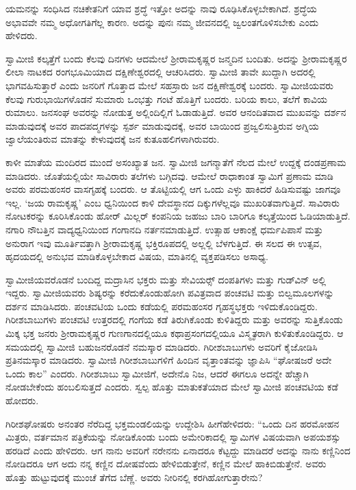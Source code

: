  ಯಮನನ್ನು ಸಂಧಿಸಿದ ನಚಿಕೇತನಿಗೆ ಯಾವ ಶ್ರದ್ಧೆ ಇತ್ತೋ ಅದನ್ನು ನಾವು ರೂಢಿಸಿಕೊಳ್ಳಬೇಕಾಗಿದೆ. ಶ್ರದ್ಧೆಯ ಅಭಾವವೇ ನಮ್ಮ ಅಧೋಗತಿಗೆಲ್ಲ ಕಾರಣ. ಅದನ್ನು ಪುನಃ ನಮ್ಮ ಜೀವನದಲ್ಲಿ ಜ್ವಲಂತಗೊಳಿಸಬೇಕು ಎಂದು ಹೇಳಿದರು. 

 ಸ್ವಾಮೀಜಿ ಕಲ್ಕತ್ತೆಗೆ ಬಂದು ಕೆಲವು ದಿನಗಳು ಆದಮೇಲೆ ಶ‍್ರೀರಾಮಕೃಷ್ಣರ ಜನ್ಮದಿನ ಬಂದಿತು. ಅದನ್ನು ಶ‍್ರೀರಾಮಕೃಷ್ಣರ ಲೀಲಾ ನಾಟಕದ ರಂಗಭೂಮಿಯಾದ ದಕ್ಷಿಣೇಶ್ವರದಲ್ಲಿ ಆಚರಿಸಿದರು. ಸ್ವಾಮೀಜಿ ತಾವೇ ಖುದ್ದಾಗಿ ಅದರಲ್ಲಿ ಭಾಗವಹಿಸುತ್ತಾರೆ ಎಂದು ಜನರಿಗೆ ಗೊತ್ತಾದ ಮೇಲೆ ಸಹಸ್ರಾರು ಜನ ದಕ್ಷಿಣೇಶ್ವರಕ್ಕೆ ಬಂದರು. ಸ್ವಾಮೀಜಿಯವರು ಕೆಲವು ಗುರುಭಾಯಿಗಳೊಡನೆ ಸುಮಾರು ಒಂಭತ್ತು ಗಂಟೆ ಹೊತ್ತಿಗೆ ಬಂದರು. ಬರಿಯ ಕಾಲು, ತಲೆಗೆ ಕಾವಿಯ ರುಮಾಲು. ಜನಸಂಘ ಅವರನ್ನು ನೋಡುತ್ತ ಅಲ್ಲಿಂದಿಲ್ಲಿಗೆ ಓಡಾಡುತ್ತಿದೆ. ಅವರ ಆನಂದಿತವಾದ ಮುಖವನ್ನು ದರ್ಶನ ಮಾಡುವುದಕ್ಕೆ ಅವರ ಪಾದಪದ್ಮಗಳನ್ನು ಸ್ಪರ್ಶ ಮಾಡುವುದಕ್ಕೆ, ಅವರ ಬಾಯಿಂದ ಪ್ರಜ್ವಲಿಸುತ್ತಿರುವ ಅಗ್ನಿಯ ಜ್ವಾಲೆಯಂತಿರುವ ಮಾತನ್ನು ಕೇಳುವುದಕ್ಕೆ ಜನ ಕುತೂಹಲಿಗಳಾಗಿರುವರು. 

 ಕಾಳೀ ಮಾತೆಯ ಮಂದಿರದ ಮುಂದೆ ಅಸಂಖ್ಯಾತ ಜನ. ಸ್ವಾಮೀಜಿ ಜಗನ್ಮಾತೆಗೆ ನೆಲದ ಮೇಲೆ ಉದ್ದಕ್ಕೆ ದಂಡಪ್ರಣಾಮ ಮಾಡಿದರು. ಜೊತೆಯಲ್ಲಿಯೇ ಸಾವಿರಾರು ತಲೆಗಳು ಬಗ್ಗಿದವು. ಆಮೇಲೆ ರಾಧಾಕಾಂತ ಸ್ವಾಮಿಗೆ ಪ್ರಣಾಮ ಮಾಡಿ ಅವರು ಪರಮಹಂಸರ ವಾಸಗೃಹಕ್ಕೆ ಬಂದರು. ಆ ತೊಟ್ಟಿಯಲ್ಲಿ ಆಗ ಒಂದು ಎಳ್ಳು ಹಾಕಿದರೆ ಹಿಡಿಸುವಷ್ಟು ಜಾಗವೂ ಇಲ್ಲ. ‘ಜಯ ರಾಮಕೃಷ್ಣ’ ಎಂಬ ಧ್ವನಿಯಿಂದ ಕಾಳಿ ದೇವಸ್ಥಾನದ ದಿಕ್ಕುಗಳೆಲ್ಲವೂ ಮುಖರಿತವಾಗುತ್ತಿದೆ. ಸಾವಿರಾರು ನೋಟಕರನ್ನು ಕೂರಿಸಿಕೊಂಡು ಹೋರ್ ಮಿಲ್ಲರ್ ಕಂಪನಿಯ ಜಹಜು ಬಾರಿ ಬಾರಿಗೂ ಕಲ್ಕತ್ತೆಯಿಂದ ಓಡಿಯಾಡುತ್ತಿದೆ. ನಗಾರಿ ನೌಬತ್ತಿನ ವಾದ್ಯಧ್ವನಿಯಿಂದ ಗಂಗಾನದಿ ನರ್ತನಮಾಡುತ್ತಿದೆ. ಉತ್ಸಾಹ ಆಕಾಂಕ್ಷೆ ಧರ್ಮಪಿಪಾಸೆ ಮತ್ತು ಅನುರಾಗ ಇವು ಮೂರ್ತಿವತ್ತಾಗಿ ಶ‍್ರೀರಾಮಕೃಷ್ಣ ಭಕ್ತಿರೂಪದಲ್ಲಿ ಅಲ್ಲಲ್ಲಿ ಬೆಳಗುತ್ತಿದೆ. ಈ ಸಲದ ಈ ಉತ್ಸವ, ಹೃದಯದಲ್ಲಿ ಅನುಭವ ಮಾಡಿಕೊಳ್ಳಬೇಕಾದ ವಿಷಯ, ಮಾತಿನಲ್ಲಿ ವ್ಯಕ್ತಪಡಿಸಲು ಅಸಾಧ್ಯ. 

 ಸ್ವಾಮೀಜಿಯವರೊಡನೆ ಬಂದಿದ್ದ ಮದ್ರಾಸಿನ ಭಕ್ತರು ಮತ್ತು ಸೇವಿಯರ್ಸ್‍‍ ದಂಪತಿಗಳು ಮತ್ತು ಗುಡ್‍ವಿನ್ ಅಲ್ಲಿ ಇದ್ದರು. ಸ್ವಾಮೀಜಿಯವರು ಶಿಷ್ಯರನ್ನು ಕರೆದುಕೊಂಡುಹೋಗಿ ಪವಿತ್ರವಾದ ಪಂಚವಟಿ ಮತ್ತು ಬಿಲ್ವಮೂಲಗಳನ್ನು ದರ್ಶನ ಮಾಡಿಸಿದರು. ಪಂಚವಟಿಯ ಒಂದು ಕಡೆಯಲ್ಲಿ ಪರಮಹಂಸರ ಗೃಹಸ್ಥಭಕ್ತರು ಇಳಿದುಕೊಂಡಿದ್ದರು. ಗಿರೀಶಬಾಬುಗಳು ಪಂಚವಟಿ ಉತ್ತರದಲ್ಲಿ ಗಂಗೆಯ ಕಡೆ ತಿರುಗಿಕೊಂಡು ಕುಳಿತಿದ್ದರು ಮತ್ತು ಅವರನ್ನು ಸುತ್ತಿಕೊಂಡು ಮಿಕ್ಕ ಭಕ್ತ ಜನರು ಶ‍್ರೀರಾಮಕೃಷ್ಣರ ಗುಣಗಾನದಲ್ಲಿಯೂ ಕಥಾಪ್ರಸಂಗದಲ್ಲಿಯೂ ವಿಸ್ಮೃತರಾಗಿ ಕುಳಿತುಕೊಂಡಿದ್ದರು. ಆ ಸಮಯದಲ್ಲಿ ಸ್ವಾಮೀಜಿ ಬಹುಜನರೊಡನೆ ನಮಸ್ಕಾರ ಮಾಡಿದರು. ಗಿರೀಶಬಾಬುಗಳು ಅವರಿಗೆ ಕೈಜೋಡಿಸಿ ಪ್ರತಿನಮಸ್ಕಾರ ಮಾಡಿದರು. ಸ್ವಾಮೀಜಿ ಗಿರೀಶಬಾಬುಗಳಿಗೆ ಹಿಂದಿನ ವೃತ್ತಾಂತವನ್ನು ಜ್ಞಾಪಿಸಿ “ಘೋಷಜರೆ ಅದೇ ಒಂದು ಕಾಲ” ಎಂದರು. ಗಿರೀಶಬಾಬು ಸ್ವಾಮೀಜಿಗೆ, ಅದೇನೊ ನಿಜ, ಆದರೆ ಈಗಲೂ ಅದನ್ನೇ ಹೆಚ್ಚಾಗಿ ನೋಡಬೇಕೆಂದು ಹಂಬಲಿಸುತ್ತದೆ ಎಂದರು. ಸ್ವಲ್ಪ ಹೊತ್ತು ಮಾತುಕತೆಯಾದ ಮೇಲೆ ಸ್ವಾಮೀಜಿ ಪಂಚವಟಿಯ ಕಡೆ ಹೋದರು. 

\vskip 3pt

 ಗಿರೀಶಘೋಷರು ಅನಂತರ ನೆರೆದಿದ್ದ ಭಕ್ತಮಂಡಲಿಯನ್ನು ಉದ್ದೇಶಿಸಿ ಹೀಗೆ\break ಹೇಳಿದರು: “ಒಂದು ದಿನ ಹರಮೋಹನ ಮಿತ್ರರು, ವರ್ತಮಾನ ಪತ್ರಿಕೆಯನ್ನು ನೋಡಿಕೊಂಡು ಬಂದು ಅಮೇರಿಕಾದಲ್ಲಿ ಸ್ವಾಮಿಗಳ ವಿಷಯವಾಗಿ ಅಪಯಶಸ್ಸು ಹರಡಿದೆ ಎಂದು ಹೇಳಿದರು. ಆಗ ನಾನು ಅವರಿಗೆ ನರೇನನು ಏನಾದರೂ ಕೆಟ್ಟದ್ದು ಮಾಡಿದರೆ ಅದನ್ನು ನಾನು ಕಣ್ಣಿನಿಂದ ನೋಡಿದರೂ ಆಗ ಅದು ನನ್ನ ಕಣ್ಣಿನ ದೋಷವೆಂದು ಹೇಳಿಬಿಡುತ್ತೇನೆ, ಕಣ್ಣಿನ ಮೇಲೆ ಹಾಕಿಬಿಡುತ್ತೇನೆ. ಅವರು ಹೊತ್ತು ಹುಟ್ಟುವುದಕ್ಕೆ ಮುಂಚೆ ತೆಗೆದ ಬೆಣ್ಣೆ. ಅವರು ನೀರಿನಲ್ಲಿ ಕರಗಿಹೋಗುತ್ತಾರೇನು?

